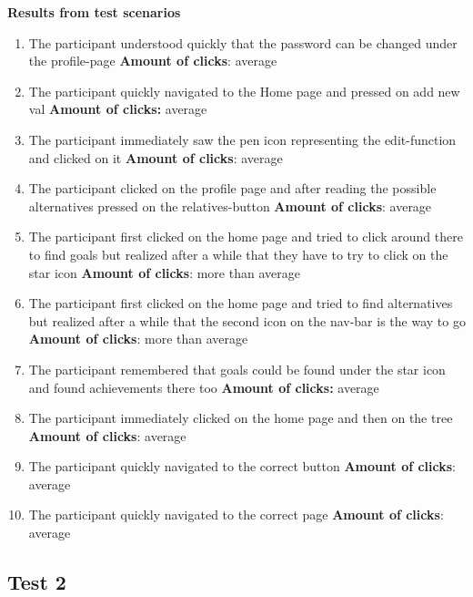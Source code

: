 \noindent\textbf{Results from test scenarios}
\begin{enumerate}
\item The participant understood quickly that the password can be changed under the profile-page
\subitem \textbf{Amount of clicks}: average
\item The participant quickly navigated to the Home page and pressed on add new val
\subitem \textbf{Amount of clicks:} average
\item The participant immediately saw the pen icon representing the edit-function and clicked
on it
\subitem \textbf{Amount of clicks}: average
\item The participant clicked on the profile page and after reading the possible alternatives pressed on the relatives-button
\subitem \textbf{Amount of clicks}: average
\item The participant first clicked on the home page and tried to click around there to find goals but realized after a while that they have to try to click on the star icon 
\subitem \textbf{Amount of clicks}: more than average
\item The participant first clicked on the home page and tried to find alternatives but realized after a while that the second icon on the nav-bar is the way to go
\subitem \textbf{Amount of clicks}: more than average
\item The participant remembered that goals could be found under the star icon and found achievements there too
\subitem \textbf{Amount of clicks:} average 
\item The participant immediately clicked on the home page and then on the tree 
\subitem \textbf{Amount of clicks}: average 
\item The participant quickly navigated to the correct button
\subitem \textbf{Amount of clicks}: average 
\item The participant quickly navigated to the correct page
\subitem \textbf{Amount of clicks}: average 
\end{enumerate}
	




\subsection{Test 2}

